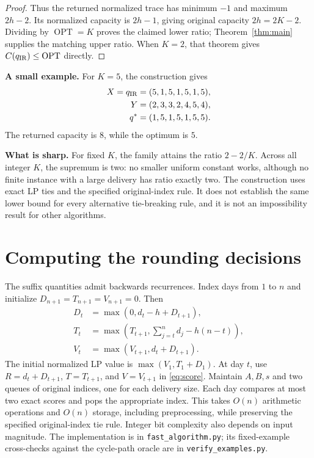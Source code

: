 \documentclass[11pt]{article}
\newcommand{\OPT}{\operatorname{OPT}}
\begin{document}
\begin{proof}
Thus the returned normalized trace has minimum $-1$ and maximum $2h-2$.
Its normalized capacity is $2h-1$, giving original capacity
$2h=2K-2$. Dividing by $\OPT=K$ proves the claimed lower ratio;
Theorem~\ref{thm:main} supplies the matching upper ratio. When $K=2$,
that theorem gives $C(q_{\rm IR})\le\OPT$ directly.
\end{proof}

\noindent\textbf{A small example.} For $K=5$, the construction gives
\[
\begin{aligned}
X=q_{\rm IR}&=(5,1,5,1,5,1,5),\\
Y&=(2,3,3,2,4,5,4),\\
q^*&=(1,5,1,5,1,5,5).
\end{aligned}
\]
The returned capacity is $8$, while the optimum is $5$.

\noindent\textbf{What is sharp.}
For fixed $K$, the family attains the ratio $2-2/K$.
Across all integer $K$, the supremum is two: no smaller uniform constant
works, although no finite instance with a large delivery has ratio exactly two.
The construction uses exact LP ties and the specified original-index rule.
It does not establish the same lower bound for every alternative tie-breaking
rule, and it is not an impossibility result for other algorithms.

\section{Computing the rounding decisions}\label{sec:algorithm}
The suffix quantities admit backwards recurrences. Index days from $1$ to
$n$ and initialize $D_{n+1}=T_{n+1}=V_{n+1}=0$. Then
\begin{align*}
D_t&=\max(0,d_t-h+D_{t+1}),\\
T_t&=\max\left(T_{t+1},\sum_{j=t}^n d_j-h(n-t)\right),\\
V_t&=\max(V_{t+1},d_t+D_{t+1}).
\end{align*}
The initial normalized LP value is $\max(V_1,T_1+D_1)$.
At day $t$, use $R=d_t+D_{t+1}$, $T=T_{t+1}$, and $V=V_{t+1}$ in
\eqref{eq:score}. Maintain $A,B,s$ and two queues of original indices,
one for each delivery size. Each day compares at most two exact scores
and pops the appropriate index. This takes $O(n)$ arithmetic operations
and $O(n)$ storage, including preprocessing, while preserving the specified
original-index tie rule. Integer bit complexity also depends on input magnitude.
The implementation is in \texttt{fast\_algorithm.py}; its fixed-example
cross-checks against the cycle-path oracle are in \texttt{verify\_examples.py}.
\end{document}
